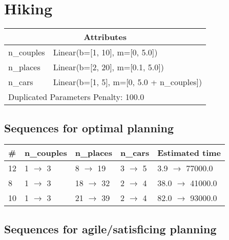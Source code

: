 \documentclass{article}
\begin{document}
                            \newpage \section{Hiking}
                    \begin{center}
                    \begin{tabular}{@{}p{}p{}@{}}
                    \multicolumn{2}{c}{\bf \large Attributes}\\\midrule
                    n\_couples & Linear(b=[1, 10], m=[0, 5.0])\\
n\_places & Linear(b=[2, 20], m=[0.1, 5.0])\\
n\_cars & Linear(b=[1, 5], m=[0, 5.0 + n\_couples]) \\\midrule
                    \multicolumn{2}{l}{Duplicated Parameters Penalty: 100.0}
                    \end{tabular}
                    \end{center}
                
                            \subsection*{Sequences for optimal planning}

                            \begin{center}
                            \begin{tabular}{@{}l|l|l|l|l@{}}
                            \# & n\_couples & n\_places & n\_cars & Estimated time\\\midrule
                            12&1 $\rightarrow$ 3&8 $\rightarrow$ 19&3 $\rightarrow$ 5&3.9 $\rightarrow$ 77000.0\\
8&1 $\rightarrow$ 3&18 $\rightarrow$ 32&2 $\rightarrow$ 4&38.0 $\rightarrow$ 41000.0\\
10&1 $\rightarrow$ 3&21 $\rightarrow$ 39&2 $\rightarrow$ 4&82.0 $\rightarrow$ 93000.0
                            \end{tabular}
                            \end{center}
                    
                         \subsection*{Sequences for agile/satisficing planning}
\end{document}
